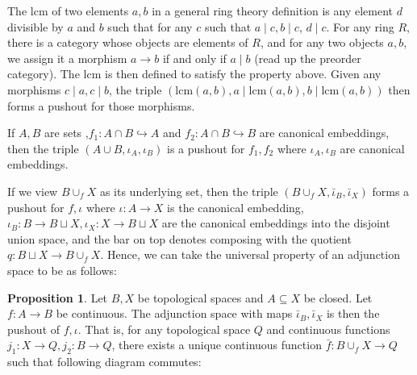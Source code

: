 \documentclass[12pt,reqno]{amsart}
\numberwithin{theorem}{section}
\theoremstyle{definition}
\theoremstyle{remark}
\numberwithin{equation}{section}
\theoremstyle{definition}
\newtheorem{prop}[theorem]{Proposition}
\begin{document}
\begin{example}
    The $\mathrm{lcm}$ of two elements $a,b$ in a general ring theory definition is any element $d$ divisible by $a$ and $b$ such that for any $c $ such that $a \mid c, b \mid c$, $d \mid c$. For any ring $R$, there is a category whose objects are elements of $R$, and for any two objects $a,b$, we assign it a morphism $a \rightarrow b$ if and only if $a \mid b$ (read up the preorder category). The $\mathrm{lcm}$ is then defined to satisfy the property above. Given any morphisms $c \mid a, c \mid b$, the triple $(\mathrm{lcm}(a,b), a\mid \mathrm{lcm}(a,b), b \mid \mathrm{lcm}(a,b))$ then forms a pushout for those morphisms.
\end{example}
\begin{example}
    If $A,B$ are sets ,$f_1 : A\cap B\hookrightarrow A$ and $f_2: A\cap B \hookrightarrow B$ are canonical embeddings, then the triple $(A\cup B, \iota_A,\iota_B)$ is a pushout for $f_1,f_2$ where $\iota_A,\iota_B$ are canonical embeddings.
\end{example}

If we view $B\cup_f X$ as its underlying set, then the triple $(B\cup_f X,\bar \iota_B,\bar \iota_X)$ forms a pushout for $f,\iota$ where $\iota:A\rightarrow X$ is the canonical embedding, $\iota_B: B\rightarrow B\sqcup X, \iota_X: X\rightarrow B\sqcup X$ are the canonical embeddings into the disjoint union space, and the bar on top denotes composing with the quotient $q:B\sqcup X \rightarrow B\cup_f X$. Hence, we can take the universal property of an adjunction space to be as follows:
\begin{prop}
    Let $B,X$ be topological spaces and $A\subseteq X$ be closed. Let $f:A\rightarrow B$ be continuous. The adjunction space with maps $\bar \iota_B, \bar \iota_X$ is then the pushout of $f,\iota$. That is, for any  topological space $Q$ and continuous functions $j_1:X \rightarrow Q, j_2:B \rightarrow Q$, there exists a unique continuous function $\bar f: B\cup_f X \rightarrow Q$ such that following diagram commutes:
    \begin{center}
    \end{center}
\end{prop}
\end{document}

